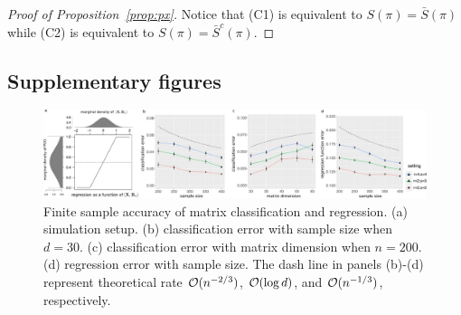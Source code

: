 \documentclass[11pt]{article}
\theoremstyle{plain}
\theoremstyle{definition}
\begin{document}
\begin{proof}[Proof of Proposition~\ref{prop:px}]
Notice that (C1) is equivalent to $S(\pi) = \bar S(\pi)$ while (C2) is equivalent to $S(\pi) = \bar S^c(\pi).$
\end{proof}



\clearpage
\subsection{Supplementary figures}\label{sec:sfigure}
     \begin{figure}[ht]
    \centering
    \includegraphics[width=16cm]{combined_linear.pdf}
    \caption{Finite sample accuracy of matrix classification and regression. (a) simulation setup. (b) classification error with sample size when $d=30$. (c) classification error with matrix dimension when $n=200$. (d) regression error with sample size. 
    The dash line in panels (b)-(d) represent theoretical rate $\mathcal{O}(n^{-2/3})$, $\mathcal{O}(\log d)$, and $\mathcal{O}(n^{-1/3})$, respectively. }\label{fig:linear}
\end{figure}
\end{document}
